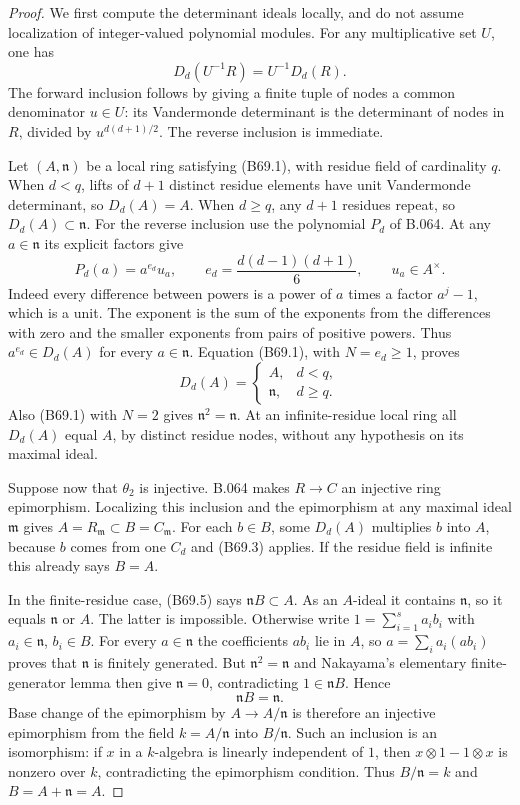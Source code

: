 \begin{proof}
We first compute the determinant ideals locally, and do not assume
localization of integer-valued polynomial modules. For any multiplicative
set $U$, one has
\[
                   D_d(U^{-1}R)=U^{-1}D_d(R).              \tag{B69.3}
\]
The forward inclusion follows by giving a finite tuple of nodes a common
denominator $u\in U$: its Vandermonde determinant is the determinant of
nodes in $R$, divided by $u^{d(d+1)/2}$. The reverse inclusion is immediate.

Let $(A,\mathfrak n)$ be a local ring satisfying (B69.1), with residue
field of cardinality $q$. When $d<q$, lifts of $d+1$ distinct residue
elements have unit Vandermonde determinant, so $D_d(A)=A$. When $d\ge q$,
any $d+1$ residues repeat, so $D_d(A)\subset\mathfrak n$.
For the reverse inclusion use the polynomial $P_d$ of B.064. At any
$a\in\mathfrak n$ its explicit factors give
\[
 P_d(a)=a^{e_d}u_a,\qquad
 e_d=\frac{d(d-1)(d+1)}6,\qquad u_a\in A^\times.            \tag{B69.4}
\]
Indeed every difference between powers is a power of $a$ times a factor
$a^j-1$, which is a unit. The exponent is the sum of the exponents from
the differences with zero and the smaller exponents from pairs of
positive powers. Thus $a^{e_d}\in D_d(A)$ for every $a\in\mathfrak n$.
Equation (B69.1), with $N=e_d\ge1$, proves
\[
 D_d(A)=
 \begin{cases}A,&d<q,\\ \mathfrak n,&d\ge q.\end{cases}     \tag{B69.5}
\]
Also (B69.1) with $N=2$ gives $\mathfrak n^2=\mathfrak n$.
At an infinite-residue local ring all $D_d(A)$ equal $A$, by distinct
residue nodes, without any hypothesis on its maximal ideal.

Suppose now that $\theta_2$ is injective. B.064 makes $R\to C$ an
injective ring epimorphism. Localizing this inclusion and the epimorphism
at any maximal ideal $\mathfrak m$ gives $A=R_{\mathfrak m}\subset
B=C_{\mathfrak m}$. For each $b\in B$, some $D_d(A)$ multiplies $b$ into
$A$, because $b$ comes from one $C_d$ and (B69.3) applies. If the residue
field is infinite this already says $B=A$.

In the finite-residue case, (B69.5) says
$\mathfrak nB\subset A$. As an $A$-ideal it contains $\mathfrak n$, so it
equals $\mathfrak n$ or $A$. The latter is impossible. Otherwise write
$1=\sum_{i=1}^s a_i b_i$ with $a_i\in\mathfrak n$, $b_i\in B$. For every
$a\in\mathfrak n$ the coefficients $ab_i$ lie in $A$, so
$a=\sum_i a_i(ab_i)$ proves that $\mathfrak n$ is finitely generated.
But $\mathfrak n^2=\mathfrak n$ and Nakayama's elementary finite-generator
lemma then give $\mathfrak n=0$, contradicting $1\in\mathfrak nB$.
Hence
\[
                         \mathfrak nB=\mathfrak n.         \tag{B69.6}
\]
Base change of the epimorphism by $A\to A/\mathfrak n$ is therefore an
injective epimorphism from the field $k=A/\mathfrak n$ into
$B/\mathfrak n$. Such an inclusion is an isomorphism: if $x$ in a
$k$-algebra is linearly independent of $1$, then
$x\otimes1-1\otimes x$ is nonzero over $k$, contradicting the epimorphism
condition. Thus $B/\mathfrak n=k$ and $B=A+\mathfrak n=A$.


\end{proof}
